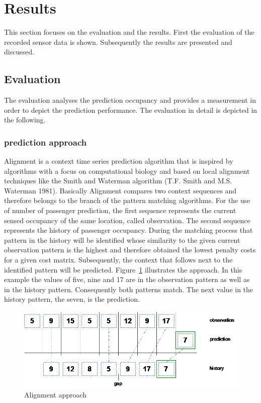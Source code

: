 \section{Results}
\label{sec:results}

This section focuses on the evaluation and the results. First the evaluation of the recorded sensor data is shown. Subsequently the results are presented and discussed.


\subsection{Evaluation}
\label{subsec:evaluation}

The evaluation analyses the prediction occupancy and provides a measurement in order to depict the prediction performance. The evaluation in detail is depicted in the following.


\subsubsection{prediction approach}
\label{subsubsec:predictionApproach}

Alignment is a context time series prediction algorithm that is inspired by algorithms with a focus on computational biology and based on local alignment techniques like the Smith and Waterman algorithm (T.F. Smith and M.S. Waterman 1981). Basically Alignment compares two context sequences and therefore belongs to the branch of the pattern matching algorithms. For the use of number of passenger prediction, the first sequence represents the current sensed occupancy of the same location, called observation. The second sequence represents the history of passenger occupancy.
During the matching process that pattern in the history will be identified whose similarity to the given current observation pattern is the highest and therefore obtained the lowest penalty costs for a given cost matrix. Subsequently, the context that follows next to the identified pattern will be predicted. Figure~\ref{fig:alignmentApproach} illustrates the approach. In this example the values of five, nine and 17 are in the observation pattern as well as in the history pattern. Consequently both patterns match. The next value in the history pattern, the seven, is the prediction.

\begin{figure}[htb]
  \centering
  \includegraphics[width=0.9\linewidth]{Figures/alignmentApproach.png} 
  \caption{Alignment approach}
  \label{fig:alignmentApproach}
\end{figure}

